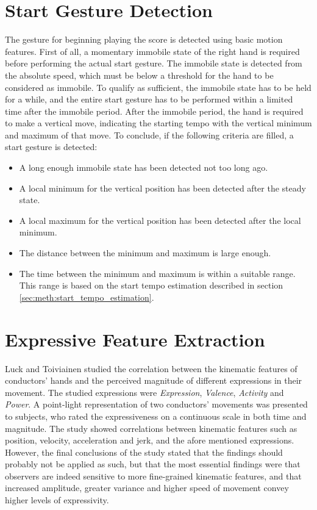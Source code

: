 \section{Start Gesture Detection}

The gesture for beginning playing the score
is detected using basic motion features.
First of all,
a momentary immobile state of the right hand is required
before performing the actual start gesture.
The immobile state is detected from the absolute speed,
which must be below a threshold for the hand to be considered as immobile.
To qualify as sufficient,
the immobile state has to be held for a while,
and the entire start gesture has to be performed
within a limited time after the immobile period.
After the immobile period,
the hand is required to make a vertical move,
indicating the starting tempo with the 
vertical minimum and maximum of that move.
To conclude, if the following criteria are filled,
a start gesture is detected:
\begin{itemize}
\item A long enough immobile state has been detected not too long ago.
\item A local minimum for the vertical position has been detected after the steady state.
\item A local maximum for the vertical position has been detected after the local minimum.
\item The distance between the minimum and maximum is large enough.
\item The time between the minimum and maximum is within a suitable range.
This range is based on the start tempo estimation described in section
\ref{sec:meth:start_tempo_estimation}.
\end{itemize}

\section{Expressive Feature Extraction}

Luck and Toiviainen \cite{luck2010}
studied the correlation between the kinematic features of conductors' hands
and the perceived magnitude of different expressions in their movement.
The studied expressions were
\textit{Expression}, \textit{Valence}, \textit{Activity} and \textit{Power}.
A point-light representation of two conductors' movements
was presented to subjects, who rated the expressiveness
on a continuous scale in both time and magnitude.
The study showed correlations between kinematic features
such as position, velocity, acceleration and jerk,
and the afore mentioned expressions.
However, the final conclusions of the study stated that
the findings should probably not be applied as such,
but that the most essential findings were that observers
are indeed sensitive to more fine-grained kinematic features,
and that increased amplitude, greater variance and higher speed of movement
convey higher levels of expressivity.

